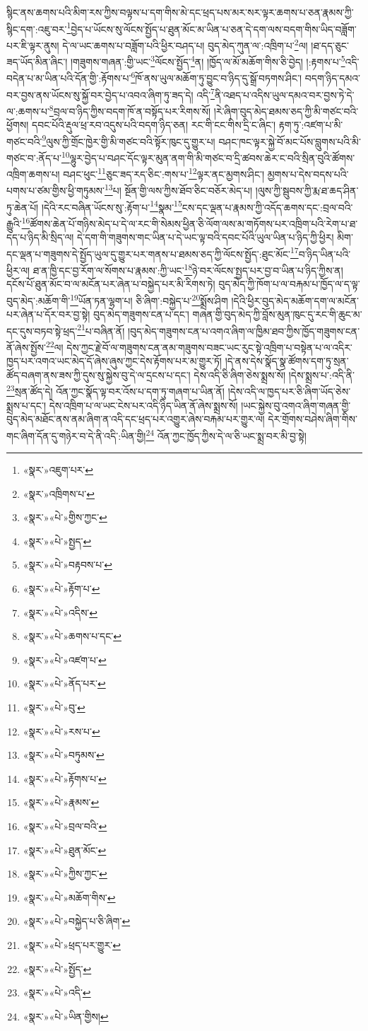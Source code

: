 སྙིང་ནས་ཆགས་པའི་མིག་རས་ཀྱིས་བལྟས་པ་དག་གིས་མེ་དང་ཕྲད་པས་མར་སར་ལྟར་ཆགས་པ་ཅན་རྣམས་ཀྱི་སྙིང་དག་:འཇུ་བར་\footnote{«སྣར་»འཇུག་པར་}བྱེད་པ་ཡོངས་སུ་ལོངས་སྤྱོད་པ་ཐུན་མོང་མ་ཡིན་པ་ཅན་དེ་དག་ལས་བདག་གིས་ཡིད་བཟློག་པར་ཇི་ལྟར་ནུས། དེ་ལ་ཡང་ཆགས་པ་བཟློག་པའི་ཕྱིར་བཤད་པ། བུད་མེད་ཀུན་ལ་:འཁྲིག་པ་\footnote{«སྣར་»འཁྲིགས་པ་}ལ། །ཐ་དད་ཅུང་ཟད་ཡོད་མིན་ཞིང་། །གཟུགས་གཞན་:གྱི་ཡང་\footnote{«སྣར་»«པེ་»གྱིས་ཀྱང་}ལོངས་སྤྱོད་\footnote{«སྣར་»«པེ་»སྤྱད་}ན། །ཁྱོད་ལ་མོ་མཆོག་གིས་ཅི་བྱེད། །:རྟགས་པ་\footnote{«སྣར་»«པེ་»བརྟབས་པ་}འདི་བདེན་པ་མ་ཡིན་པའི་དོན་གྱི་:རྟོགས་པ་\footnote{«སྣར་»«པེ་»རྟོག་པ་}ཁོ་ནས་ཡུལ་མཆོག་ཏུ་བྱུང་བ་ཉིད་དུ་སྒྲོ་བཏགས་ཤིང་། བདག་ཉིད་དམའ་བར་བྱས་ནས་ཡོངས་སུ་སྐྱོ་བར་བྱེད་པ་འབའ་ཞིག་ཏུ་ཟད་དེ། འདི་\footnote{«སྣར་»«པེ་»འདིས་}ནི་འཐད་པ་འདིས་ཡུལ་དམའ་བར་བྱས་ཏེ་དེ་ལ་:ཆགས་པ་\footnote{«སྣར་»«པེ་»ཆགས་པ་དང་}བྲལ་བ་ཉིད་ཀྱིས་བདག་ཁོ་ན་བསྟོད་པར་རིགས་སོ། །རེ་ཞིག་བུད་མེད་ཐམས་ཅད་ཀྱི་མི་གཙང་བའི་ཕྱོགས། དབང་པོའི་རྡུལ་ཕྲ་རབ་འདུས་པའི་བདག་ཉིད་ཅན། རང་གི་ངང་གིས་དྲི་ང་ཞིང་། རྟག་ཏུ་:འཛག་པ་མི་གཙང་བའི་\footnote{«སྣར་»«པེ་»འཛག་པ་}ལུས་ཀྱི་གྲོང་ཁྱེར་གྱི་མི་གཙང་བའི་སྟོར་ཁུང་དུ་གྱུར་པ། བཤང་ཁང་ལྟར་སྐྱེ་བོ་མང་པོས་བླུགས་པའི་མི་གཙང་བ་:ནོད་པ་\footnote{«སྣར་»«པེ་»ནོད་པར་}ལྷུར་བྱེད་པ་བཤང་དོང་ལྟར་མུན་ནག་གི་མི་གཙང་བ་དྲི་ཚབས་ཆེར་ང་བའི་སྲིན་བུའི་ཚོགས་འཁྲིག་ཆགས་པ། བཤང་ཕུང་\footnote{«སྣར་»«པེ་»བུ་}ཅུང་ཟད་རད་ཅིང་:གས་པ་\footnote{«སྣར་»«པེ་»རས་པ་}ལྟར་ནང་མྱགས་ཤིང་། མྱགས་པ་དེས་བདས་པའི་པགས་པ་ཙམ་གྱིས་ཕྱི་གཏུམས་\footnote{«སྣར་»«པེ་»བཏུམས་}པ། སྔོན་གྱི་ལས་ཀྱིས་ཐོབ་ཅིང་བཅོར་མེད་པ། །ལུས་ཀྱི་སྦུབས་ཀྱི་རྨ་ཐ་ཆད་ཤིན་ཏུ་ཆེན་པོ། །དེའི་རང་བཞིན་ཡོངས་སུ་:རྟོག་པ་\footnote{«སྣར་»«པེ་»རྟོགས་པ་}སྣམ་\footnote{«སྣར་»«པེ་»རྣམས་}ངས་དང་ལྡན་པ་རྣམས་ཀྱི་འདོད་ཆགས་དང་:བྲལ་བའི་རྒྱུའི་\footnote{«སྣར་»«པེ་»བྲལ་བའི་}ཚོགས་ཆེན་པོ་གཉིས་མེད་པ་དེ་ལ་རང་གི་སེམས་ཕྱིན་ཅི་ལོག་ལས་མ་གཏོགས་པར་འཁྲིག་པའི་རེག་པ་ཐ་དད་པ་ཉིད་མི་སྲིད་ལ། དེ་དག་གི་གཟུགས་གང་ཡིན་པ་དེ་ཡང་ལྟ་བའི་དབང་པོའི་ཡུལ་ཡིན་པ་ཉིད་ཀྱི་ཕྱིར། མིག་དང་ལྡན་པ་གཟུགས་དེ་སྤྱོད་ཡུལ་དུ་གྱུར་པར་གནས་པ་ཐམས་ཅད་ཀྱི་ལོངས་སྤྱོད་:ཐུང་མོང་\footnote{«སྣར་»«པེ་»ཐུན་མོང་}བ་ཉིད་ཡིན་པའི་ཕྱིར་ལ། ཐ་ན་ཁྱི་དང་བྱ་རོག་ལ་སོགས་པ་རྣམས་:ཀྱི་ཡང་\footnote{«སྣར་»«པེ་»ཀྱིས་ཀྱང་}ཉེ་བར་ལོངས་སྤྱད་པར་བྱ་བ་ཡིན་པ་ཉིད་ཀྱིས་ན། དངོས་པོ་ཐུན་མོང་བ་ལ་མངོན་པར་ཞེན་པ་བསྐྱེད་པར་མི་རིགས་ཏེ། བུད་མེད་ཀྱི་ཁོག་པ་ལ་བརྐམ་པ་ཁྱོད་ལ་ད་ལྟ་བུད་མེད་:མཆོག་གི་\footnote{«སྣར་»«པེ་»མཆོག་གིས་}ཡོན་ཏན་ལྷག་པ། ཅི་ཞིག་:བསྐྱེད་པ་\footnote{«སྣར་»«པེ་»བསྐྱེད་པ་ཅི་ཞིག་}སྨྲོས་ཤིག །དེའི་ཕྱིར་བུད་མེད་མཆོག་དག་ལ་མངོན་པར་ཞེན་པ་དོར་བར་བྱ་སྟེ། བུད་མེད་གཟུགས་ངན་པ་དང་། གཞན་གྱི་བུད་མེད་ཀྱི་བློས་མུན་ཁུང་དུ་རང་གི་ཆུང་མ་དང་དུས་བཏབ་སྟེ་ཕྲད་\footnote{«སྣར་»«པེ་»ཕྲད་པར་གྱུར་}པ་བཞིན་ནོ། །བུད་མེད་གཟུགས་ངན་པ་འགའ་ཞིག་ལ་ཁྱིམ་ཐབ་ཀྱིས་ཁྱོད་གཟུགས་ངན་ནོ་ཞེས་སྤྱོས་\footnote{«སྣར་»«པེ་»སྤྱོད་}ལ། དེས་ཀྱང་རྗེ་བོ་ལ་གཟུགས་ངན་ནམ་གཟུགས་བཟང་ཡང་རུང་སྟེ་འཁྲིག་པ་བསྟེན་པ་ལ་འདིར་ཁྱད་པར་འགའ་ཡང་མེད་དོ་ཞེས་ཞུས་ཀྱང་དེས་རྟོགས་པར་མ་གྱུར་ཏོ། །དེ་ནས་དེས་སྣོད་སྣ་ཚོགས་དག་ཏུ་སྲན་ཚོད་བཞག་ནས་ཟས་ཀྱི་དུས་སུ་སྐྱེས་བུ་དེ་ལ་དྲངས་པ་དང་། དེས་འདི་ཅི་ཞིག་ཅེས་སྨྲས་སོ། །དེས་སྨྲས་པ་:འདི་ནི་\footnote{«སྣར་»«པེ་»འདི་}སྲན་ཚོད་དེ། འོན་ཀྱང་སྣོད་ལྟ་བར་འོས་པ་དག་ཏུ་གཞག་པ་ཡིན་ནོ། །དེས་འདི་ལ་ཁྱད་པར་ཅི་ཞིག་ཡོད་ཅེས་སྨྲས་པ་དང་། དེས་འཁྲིག་པ་ལ་ཡང་ངེས་པར་འདི་ཉིད་ཡིན་ནོ་ཞེས་སྨྲས་སོ། །ཡང་སྐྱེས་བུ་འགའ་ཞིག་གཞན་གྱི་བུད་མེད་མཐོང་ནས་ནམ་ཞིག་ན་འདི་དང་ཕྲད་པར་འགྱུར་ཞེས་བརྐམ་པར་གྱུར་ལ། དེར་གྲོགས་བཤེས་ཞིག་གིས་གང་ཞིག་དོན་དུ་གཉེར་བ་དེ་ནི་འདི་:ཡིན་གྱི།\footnote{«སྣར་»«པེ་»ཡིན་གྱིས།} འོན་ཀྱང་ཁྱོད་ཀྱིས་དེ་ལ་ཅི་ཡང་སྨྲ་བར་མི་བྱ་སྟེ། 